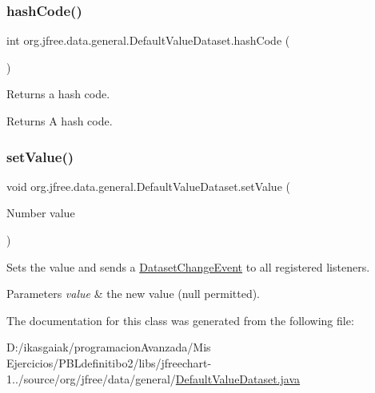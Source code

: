 \subsubsection{\texorpdfstring{hash\+Code()}{hashCode()}}
{\footnotesize\ttfamily int org.\+jfree.\+data.\+general.\+Default\+Value\+Dataset.\+hash\+Code (\begin{DoxyParamCaption}{ }\end{DoxyParamCaption})}

Returns a hash code.

\begin{DoxyReturn}{Returns}
A hash code. 
\end{DoxyReturn}
\mbox{\label{classorg_1_1jfree_1_1data_1_1general_1_1_default_value_dataset_a7b15a7a42b3608ac1be10e0c9d71ab54}} 
\subsubsection{\texorpdfstring{set\+Value()}{setValue()}}
{\footnotesize\ttfamily void org.\+jfree.\+data.\+general.\+Default\+Value\+Dataset.\+set\+Value (\begin{DoxyParamCaption}\item[{Number}]{value }\end{DoxyParamCaption})}

Sets the value and sends a \mbox{\hyperlink{classorg_1_1jfree_1_1data_1_1general_1_1_dataset_change_event}{Dataset\+Change\+Event}} to all registered listeners.


\begin{DoxyParams}{Parameters}
{\em value} & the new value ({\ttfamily null} permitted). \\
\hline
\end{DoxyParams}


The documentation for this class was generated from the following file\+:\begin{DoxyCompactItemize}
\item 
D\+:/ikasgaiak/programacion\+Avanzada/\+Mis Ejercicios/\+P\+B\+Ldefinitibo2/libs/jfreechart-\/1../source/org/jfree/data/general/\mbox{\hyperlink{_default_value_dataset_8java}{Default\+Value\+Dataset.\+java}}\end{DoxyCompactItemize}
